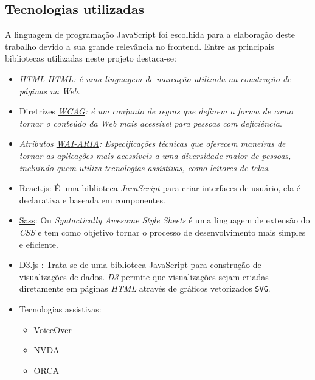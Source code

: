 \subsection{Tecnologias utilizadas} 
{A linguagem de programação JavaScript foi escolhida para a elaboração deste trabalho devido a sua grande relevância no frontend. Entre as principais bibliotecas utilizadas neste projeto destaca-se:
\begin{itemize}
\item \textit{HTML \href{https://developer.mozilla.org/pt-BR/docs/Web/HTML}{HTML}: é uma linguagem de marcação utilizada na construção de páginas na \textit{Web}}.
\item Diretrizes \textit{\href{https://www.w3c.br/traducoes/wcag/wcag21-pt-BR/}{WCAG}: é um conjunto de regras que definem a forma de como tornar o conteúdo da \textit{Web} mais acessível para pessoas com deficiência}.
\item \textit{Atributos \href{https://www.w3.org/TR/wai-aria-1.2/}{WAI-ARIA}: Especificações técnicas que oferecem maneiras de tornar as aplicações mais acessíveis a uma diversidade maior de pessoas, incluindo quem utiliza tecnologias assistivas, como leitores de telas}.
\item { \href{https://pt-br.reactjs.org/}{React.js}: É uma biblioteca \textit{JavaScript} para criar interfaces de usuário, ela é declarativa e baseada em componentes}.
\item {\href{https://sass-lang.com/}{Sass}: Ou \textit{Syntactically Awesome Style Sheets} é uma linguagem de extensão do \textit{\textit{CSS}} e tem como objetivo tornar o processo de desenvolvimento mais simples e eficiente}.
\item {\href{https://d3js.org/}{D3.js} : Trata-se de uma biblioteca {JavaScript} para construção de visualizações de dados. \textit{D3} permite que visualizações sejam criadas diretamente em páginas \textit{HTML} \cite{HTML} através de gráficos vetorizados \lstinline{SVG}}.
\item Tecnologias assistivas:
\begin{itemize}
\item \href{https://www.apple.com/br/accessibility/vision/}{VoiceOver}
\item \href{https://www.nvaccess.org/download/}{NVDA}
\item \href{https://help.gnome.org/users/orca/stable/index.html.pt_BR}{ORCA}
\end{itemize}
\end{itemize}
 }
 
